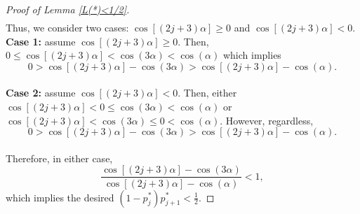 \documentclass[11pt]{article}
\theoremstyle{definition}
\begin{document}
\begin{proof}[Proof of Lemma \ref{L(*)<1/2}]
\begin{align*}
    \end{align*}
    Thus, we consider two cases: $\cos[(2j+3)\alpha] \geq 0$ and $\cos[(2j+3)\alpha] < 0$.
    \\ {\bf Case 1:} assume $\cos[(2j+3)\alpha] \geq 0$. Then, $0 \leq \cos[(2j+3)\alpha] < \cos(3\alpha) < \cos(\alpha)$ which implies
    $$0 > \cos[(2j+3)\alpha] - \cos(3\alpha) > \cos[(2j+3)\alpha] - \cos(\alpha).$$
    \\ {\bf Case 2:} assume $\cos[(2j+3)\alpha] < 0$. Then, either $\cos[(2j+3)\alpha] < 0 \leq \cos(3\alpha) < \cos(\alpha)$ or $\cos[(2j+3)\alpha] < \cos(3\alpha) \leq 0 < \cos(\alpha)$. However, regardless,
    $$0 > \cos[(2j+3)\alpha] - \cos(3\alpha) > \cos[(2j+3)\alpha] - \cos(\alpha).$$
    \\ Therefore, in either case,
    $$\frac{\cos[(2j+3)\alpha] - \cos(3\alpha)}{\cos[(2j+3)\alpha] - \cos(\alpha)} < 1,$$
    which implies the desired $(1-p_j^*)p_{j+1}^* < \frac{1}{2}$.
\end{proof}
\end{document}
